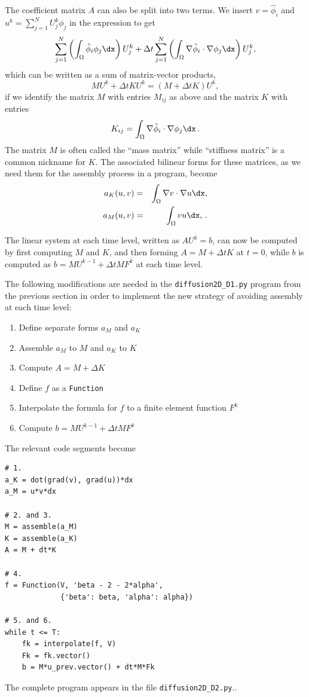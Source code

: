 The coefficient matrix $A$ can also be split into two terms.
We insert $v=\hat\phi_i$ and $u^k = \sum_{j=1}^NU^k_j\phi_j$ in
the expression  to get
\[ \sum_{j=1}^N\left(\int_\Omega \hat\phi_i\phi_j\dx\right)U^k_j + \Delta t
\sum_{j=1}^N\left(\int_\Omega \nabla\hat\phi_i\cdot\nabla\phi_j\dx\right)U^k_j,
\]
which can be written as a sum of matrix-vector products,
\[ MU^k + \Delta t KU^k = (M + \Delta t K)U^k,\]
if we identify the matrix $M$ with entries $M_{ij}$ as above and
the matrix $K$ with entries
\begin{equation} K_{ij} = \int_\Omega \nabla\hat\phi_i\cdot\nabla\phi_j\dx\langtangenep
\end{equation}
The matrix $M$ is often called the ``mass matrix'' while ``stiffness matrix''
is a common nickname for $K$. The associated bilinear forms for these
matrices, as we need them for the assembly process in a \fenics{}
program, become
\begin{eqnarray}
a_K(u,v) &=& \int_\Omega\nabla v\cdot\nabla u\dx,
\label{langtangen:diffusion:pde1:aK}\\
a_M(u,v) &=& \int_\Omega vu\dx,\label{langtangen:diffusion:pde1:aM}\langtangenep
\end{eqnarray}

The linear system at each time level, written as $AU^k=b$,
can now be computed by first computing $M$ and $K$, and then forming
$A=M+\Delta t K$ at $t=0$, while $b$ is computed as
$b=MU^{k-1} + \Delta tMF^k$ at each time level.

The following modifications are needed in the {\fontsize{12pt}{12pt}\verb!diffusion2D_D1.py!}
program from the previous section in order to implement the new
strategy of avoiding assembly at each time level:
\begin{enumerate}
\item Define separate forms $a_M$ and $a_K$
\item Assemble $a_M$ to $M$ and $a_K$ to $K$
\item Compute $A=M+\Delta K$
\item Define $f$ as a {\fontsize{12pt}{12pt}\texttt{Function}}
\item Interpolate the formula for $f$ to a finite element function $F^k$
\item Compute $b=MU^{k-1} + \Delta tMF^k$
\end{enumerate}
The relevant code segments become
\begin{Verbatim}[fontsize=\fontsize{10pt}{10pt},tabsize=8,baselinestretch=1.05,
fontfamily=tt,xleftmargin=7mm]
# 1.
a_K = dot(grad(v), grad(u))*dx
a_M = u*v*dx

# 2. and 3.
M = assemble(a_M)
K = assemble(a_K)
A = M + dt*K

# 4.
f = Function(V, 'beta - 2 - 2*alpha',
             {'beta': beta, 'alpha': alpha})

# 5. and 6.
while t <= T:
    fk = interpolate(f, V)
    Fk = fk.vector()
    b = M*u_prev.vector() + dt*M*Fk
\end{Verbatim}
\noindent
The complete program appears in the file {\fontsize{12pt}{12pt}\verb!diffusion2D_D2.py!}..


